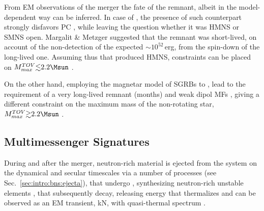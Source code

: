 From \ac{EM} observations of the merger the fate of the remnant, albeit in the 
model-dependent way can be inferred. In case of \GW{}, the presence of such counterpart 
strongly disfavors \ac{PC} \cite{Margalit:2017dij,Bauswein:2017vtn,Radice:2017lry}, while leaving the question whether it was 
\ac{HMNS} or \ac{SMNS} open. Margalit \& Metzger \cite{Margalit:2017dij} suggested that the remnant 
was short-lived, on account of the non-detection of the expected ${\sim}10^{52}\,$erg, 
from the spin-down of the long-lived one. Assuming thus that \GW{} produced \ac{HMNS}, 
constraints can be placed on $M_{max}^{TOV}{\lesssim}2.2\Msun$ \cite{Margalit:2017dij}.

On the other hand, employing the magnetar model of \acp{SGRB} to \GW{} \cite{Ai:2018jtv,Li:2018hzy,Piro:2018bpl},
lead to the requirement of a very long-lived remnant (months) and weak dipol \acp{MF} \cite{Ai:2018jtv},
giving a different constraint on the maximum mass of the non-rotating star, 
$M_{max}^{TOV}{\gtrsim}2.2\Msun$ 
. 



\subsection{Multimessenger Signatures} %

During and after the merger, neutron-rich material is ejected from the system on the 
dynamical \cite{Rosswog:1998hy, Hotokezaka:2013b, Bauswein:2013yna, Wanajo:2014wha, Radice:2018pdn} and secular \cite{Lee:2009, Perego:2014fma, Fernandez:2015use, Siegel:2017nub, Fujibayashi:2017puw, Fernandez:2018kax, Miller:2019dpt} 
timescales via a number of processes (see Sec.~\ref{sec:intro:bns:ejecta}), that 
undergo \rproc{} \nuc{}, synthesizing neutron-rich unstable elements \cite{Eichler:1989ve,Wanajo:2014wha,Cowan:2019pkx},
that subsequently decay, releasing energy that thermalizes and can be observed as 
an \ac{EM} transient, \ac{kN}, with quasi-thermal spectrum \cite{Metzger:2019zeh}. 

